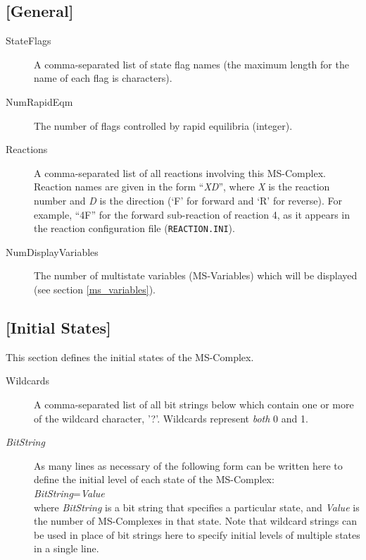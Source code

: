 \subsection{[General]}
\begin{description}
\item[StateFlags] A comma-separated list of state flag names (the
  maximum length for the name of each flag is \MAXMSFLAGLENGTH{}
  characters).
  
\item[NumRapidEqm] The number of flags controlled by rapid equilibria
  (integer).
  
\item[Reactions] A comma-separated list of all reactions involving
  this MS-Complex. Reaction names are given in the form ``\emph{XD}'',
  where \emph{X} is the reaction number and \emph{D} is the direction
  (`F' for forward and `R' for reverse).  For example, ``4F'' for the
  forward sub-reaction of reaction 4, as it appears in the reaction
  configuration file (\texttt{REACTION.INI}).
  
\item[NumDisplayVariables] The number of multistate variables
  (MS-Variables) which will be displayed (see section
  \ref{ms_variables}).
\end{description}

\subsection{[Initial States]}
This section defines the initial states of the MS-Complex.
\begin{description}
\item[Wildcards] A comma-separated list of all bit strings below which
  contain one or more of the wildcard character, '?'. Wildcards
  represent \emph{both} 0 and 1.

\item[\emph{BitString}] As many lines as necessary of the
following form can be written here to define the initial level of each
state of the MS-Complex:\\[\baselineskip]
\emph{BitString}=\emph{Value}
\\[\baselineskip]
where \emph{BitString} is a bit string that specifies a particular
state, and \emph{Value} is the number of MS-Complexes in that state.
Note that wildcard strings can be used in place of bit strings here to
specify initial levels of multiple states in a single line.
\end{description}


